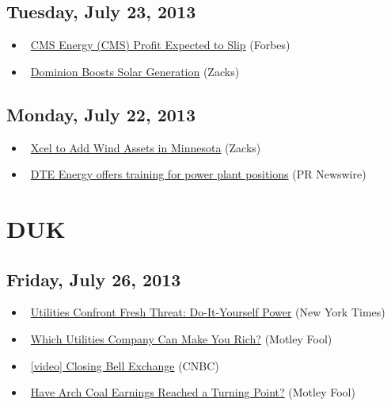 \documentclass[11pt,asymmetric]{article}
\begin{document}
\subsection*{Tuesday, July 23, 2013}
\begin{itemize}
\item\ \href{http://www.forbes.com/sites/narrativescience/2013/07/23/cms-energy-cms-profit-expected-to-slip/?partner=yahootix}{CMS Energy (CMS) Profit Expected to Slip} (Forbes)
\item\ \href{http://finance.yahoo.com/news/dominion-boosts-solar-generation-203002274.html}{Dominion Boosts Solar Generation} (Zacks)
\end{itemize}
\subsection*{Monday, July 22, 2013}
\begin{itemize}
\item\ \href{http://finance.yahoo.com/news/xcel-add-wind-assets-minnesota-212002420.html}{Xcel to Add Wind Assets in Minnesota} (Zacks)
\item\ \href{http://finance.yahoo.com/news/dte-energy-offers-training-power-194200093.html}{DTE Energy offers training for power plant positions} (PR Newswire)
\end{itemize}

\section*{DUK}

\subsection*{Friday, July 26, 2013}
\begin{itemize}
\item\ \href{http://www.nytimes.com/2013/07/27/business/energy-environment/utilities-confront-fresh-threat-do-it-yourself-power.html?partner=yahoofinance}{Utilities Confront Fresh Threat: Do-It-Yourself Power} (New York Times)
\item\ \href{http://beta.fool.com/paulinasheker/2013/07/26/which-utilities-can-make-you-rich/41337/?source=eogyholnk0000001}{Which Utilities Company Can Make You Rich?} (Motley Fool)
\item\ \href{http://video.cnbc.com/gallery/?video=3000185934&__source=yahoo%7Cheadline%7Cquote%7Cvideo%7C&par=yahoo}{[video] Closing Bell Exchange} (CNBC)
\item\ \href{http://www.fool.com/investing/general/2013/07/26/have-arch-coal-earnings-reached-a-turning-point.aspx?source=eogyholnk0000001}{Have Arch Coal Earnings Reached a Turning Point?} (Motley Fool)
\end{itemize}
\end{document}
